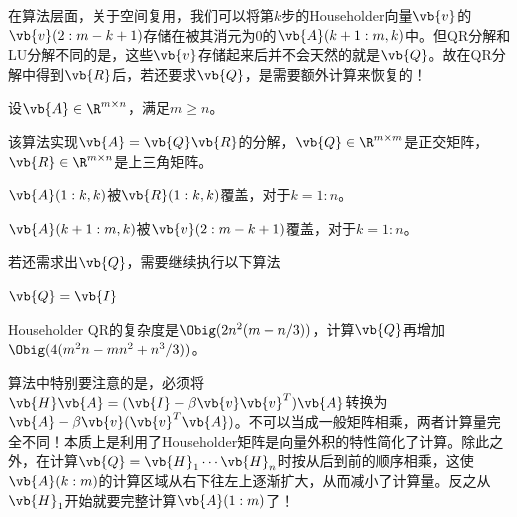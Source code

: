 在算法层面，关于空间复用，我们可以将第$k$步的Householder向量$\vb{v}$的$\vb{v}(2:m-k+1)$存储在被其消元为$0$的$\vb{A}(k+1:m,k)$中。但QR分解和LU分解不同的是，这些$\vb{v}$存储起来后并不会天然的就是$\vb{Q}$。故在QR分解中得到$\vb{R}$后，若还要求$\vb{Q}$，是需要额外计算来恢复的！

\begin{BoxAlgorithm}
    设$\vb{A}\in\R^{m\times n}$，满足$m\geq n$。

    该算法实现$\vb{A}=\vb{Q}\vb{R}$的分解，$\vb{Q}\in\R^{m\times m}$是正交矩阵，$\vb{R}\in\R^{m\times n}$是上三角矩阵。

    $\vb{A}(1:k,k)$被$\vb{R}(1:k,k)$覆盖，对于$k=1:n$。
    
    $\vb{A}(k+1:m,k)$被$\vb{v}(2:m-k+1)$覆盖，对于$k=1:n$。
    
    \begin{Algoplain}
    \end{Algoplain}

    若还需求出$\vb{Q}$，需要继续执行以下算法
    
    \begin{Algoplain}
        $\vb{Q}=\vb{I}$\;
    \end{Algoplain}
\end{BoxAlgorithm}

Householder QR的复杂度是$\Obig(2n^2(m-n/3))$，计算$\vb{Q}$再增加$\Obig(4(m^2n-mn^2+n^3/3))$。

算法中特别要注意的是，必须将$\vb{H}\vb{A}=(\vb{I}-\beta\vb{v}\vb{v}^T)\vb{A}$转换为$\vb{A}-\beta\vb{v}(\vb{v}^T\vb{A})$。不可以当成一般矩阵相乘，两者计算量完全不同！本质上是利用了Householder矩阵是向量外积的特性简化了计算。除此之外，在计算$\vb{Q}=\vb{H}_1\cdots\vb{H}_n$时按从后到前的顺序相乘，这使$\vb{A}(k:m)$的计算区域从右下往左上逐渐扩大，从而减小了计算量。反之从$\vb{H}_1$开始就要完整计算$\vb{A}(1:m)$了！
